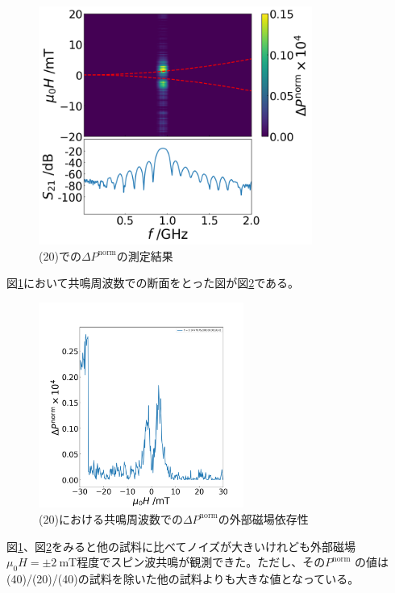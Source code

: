 \documentclass[dvipdfmx,11pt]{jsreport}
\numberwithin{equation}{chapter}
\numberwithin{table}{chapter}
\begin{document}
\begin{figure}[H]
	\centering
	\includegraphics[width=0.80\textwidth]{figdata/pyp.png}
	\caption{(20)での$\Delta P^{\text{norm}}$の測定結果}
	\label{fig:pyp}
\end{figure}
図\ref{fig:pyp}において共鳴周波数での断面をとった図が図\ref{fig:pyd}である。
\begin{figure}[H]
	\centering
	\includegraphics[width=0.6\textwidth]{figdata/py17-1danmen.png}
	\caption{\normalsize{(20)における共鳴周波数での$\Delta P^{\text{norm}}$の外部磁場依存性}}
	\label{fig:pyd}
\end{figure}
図\ref{fig:pyp}、図\ref{fig:pyd}をみると他の試料に比べてノイズが大きいけれども外部磁場$\mu_0 H=\pm\SI{2}{\milli \tesla}$程度でスピン波共鳴が観測できた。ただし、その$P^{\text{norm}}$ の値は(40)/(20)/(40)の試料を除いた他の試料よりも大きな値となっている。
\end{document}
